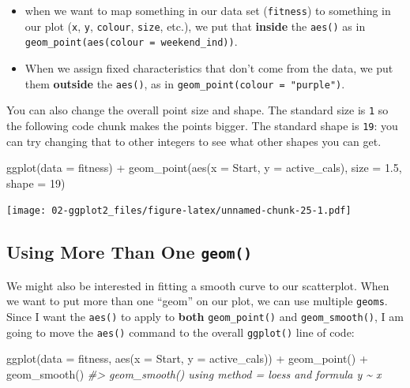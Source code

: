 \documentclass[
]{book}
\newenvironment{Shaded}{\begin{snugshade}}{\end{snugshade}}
\newcommand{\AttributeTok}[1]{\textcolor[rgb]{0.77,0.63,0.00}{#1}}
\newcommand{\CommentTok}[1]{\textcolor[rgb]{0.56,0.35,0.01}{\textit{#1}}}
\newcommand{\DecValTok}[1]{\textcolor[rgb]{0.00,0.00,0.81}{#1}}
\newcommand{\FloatTok}[1]{\textcolor[rgb]{0.00,0.00,0.81}{#1}}
\newcommand{\FunctionTok}[1]{\textcolor[rgb]{0.00,0.00,0.00}{#1}}
\newcommand{\NormalTok}[1]{#1}
\newcommand{\SpecialCharTok}[1]{\textcolor[rgb]{0.00,0.00,0.00}{#1}}
\begin{document}
\begin{itemize}
\item
  when we want to map something in our data set (\texttt{fitness}) to something in our plot (\texttt{x}, \texttt{y}, \texttt{colour}, \texttt{size}, etc.), we put that \textbf{inside} the \texttt{aes()} as in \texttt{geom\_point(aes(colour\ =\ weekend\_ind))}.
\item
  When we assign fixed characteristics that don't come from the data, we put them \textbf{outside} the \texttt{aes()}, as in \texttt{geom\_point(colour\ =\ "purple")}.
\end{itemize}

You can also change the overall point size and shape. The standard size is \texttt{1} so the following code chunk makes the points bigger. The standard shape is \texttt{19}: you can try changing that to other integers to see what other shapes you can get.

\begin{Shaded}
\begin{Highlighting}[]
\FunctionTok{ggplot}\NormalTok{(}\AttributeTok{data =}\NormalTok{ fitness) }\SpecialCharTok{+}
  \FunctionTok{geom\_point}\NormalTok{(}\FunctionTok{aes}\NormalTok{(}\AttributeTok{x =}\NormalTok{ Start, }\AttributeTok{y =}\NormalTok{ active\_cals), }\AttributeTok{size =} \FloatTok{1.5}\NormalTok{, }\AttributeTok{shape =} \DecValTok{19}\NormalTok{)}
\end{Highlighting}
\end{Shaded}

\texttt{[image: 02-ggplot2\_files/figure-latex/unnamed-chunk-25-1.pdf]}

\hypertarget{using-more-than-one-geom}{%
\subsection{\texorpdfstring{Using More Than One \texttt{geom()}}{Using More Than One geom()}}\label{using-more-than-one-geom}}

We might also be interested in fitting a smooth curve to our scatterplot. When we want to put more than one ``geom'' on our plot, we can use multiple \texttt{geoms}. Since I want the \texttt{aes()} to apply to \textbf{both} \texttt{geom\_point()} and \texttt{geom\_smooth()}, I am going to move the \texttt{aes()} command to the overall \texttt{ggplot()} line of code:

\begin{Shaded}
\begin{Highlighting}[]
\FunctionTok{ggplot}\NormalTok{(}\AttributeTok{data =}\NormalTok{ fitness, }\FunctionTok{aes}\NormalTok{(}\AttributeTok{x =}\NormalTok{ Start, }\AttributeTok{y =}\NormalTok{ active\_cals)) }\SpecialCharTok{+}
  \FunctionTok{geom\_point}\NormalTok{() }\SpecialCharTok{+}
  \FunctionTok{geom\_smooth}\NormalTok{()}
\CommentTok{\#\textgreater{} \textasciigrave{}geom\_smooth()\textasciigrave{} using method = \textquotesingle{}loess\textquotesingle{} and formula \textquotesingle{}y \textasciitilde{} x\textquotesingle{}}
\end{Highlighting}
\end{Shaded}
\end{document}
